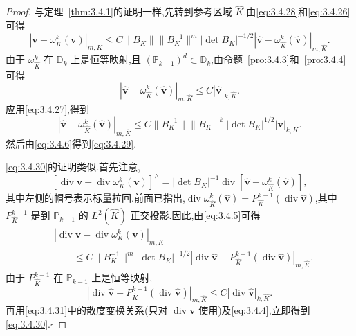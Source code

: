 \begin{proof}
与定理~\ref{thm:3.4.1}的证明一样,先转到参考区域 \(\widehat K\).由\eqref{eq:3.4.28}和\eqref{eq:3.4.26}可得
\[
  |\boldsymbol{v}-\omega_K^k(\boldsymbol{v})|_{m,K}
   \le C\|B_K\|\|B_K^{-1}\|^m|\det B_K|^{-1/2}
         |\widehat{\boldsymbol{v}}-\omega_{\widehat K}^k(\widehat{\boldsymbol{v}})|_{m,\widehat K}.
\]
由于 \(\omega_{\widehat K}^k\) 在 \(\mathbb D_k\) 上是恒等映射,且 \((\mathbb P_{k-1})^d\subset\mathbb D_k\),由命题~\ref{pro:3.4.3}和~\ref{pro:3.4.4}可得
\[
  |\widehat{\boldsymbol{v}}-\omega_{\widehat K}^k(\widehat{\boldsymbol{v}})|_{m,\widehat K}
  \le C|\widehat{\boldsymbol{v}}|_{k,\widehat K}.
\]
应用\eqref{eq:3.4.27},得到
\[
  |\widehat{\boldsymbol{v}}-\omega_{\widehat K}^k(\widehat{\boldsymbol{v}})|_{m,\widehat K}
  \le C\|B_K^{-1}\|\|B_K\|^k|\det B_K|^{1/2}|\boldsymbol{v}|_{k,K}.
\]
然后由\eqref{eq:3.4.6}得到\eqref{eq:3.4.29}.

\eqref{eq:3.4.30}的证明类似.首先注意,
\begin{equation}\label{eq:3.4.31}
  [\operatorname{div}\boldsymbol{v}-\operatorname{div}\omega_K^k(\boldsymbol{v})]^\wedge
   =|\det B_K|^{-1}
       \operatorname{div}[\widehat{\boldsymbol{v}}-\omega_{\widehat K}^k(\widehat{\boldsymbol{v}})],
\end{equation}
其中左侧的帽号表示标量拉回.前面已指出,\(\operatorname{div}\omega_{\widehat K}^k(\widehat{\boldsymbol{v}})
=P_{\widehat K}^{k-1}(\operatorname{div}\widehat{\boldsymbol{v}})\),其中 \(P_{\widehat K}^{k-1}\) 是到 \(\mathbb P_{k-1}\) 的 \(L^2(\widehat K)\) 正交投影.因此,由\eqref{eq:3.4.5}可得
\[
  \begin{aligned}
    &|\operatorname{div}\boldsymbol{v}-\operatorname{div}\omega_K^k(\boldsymbol{v})|_{m,K}\\
    &\qquad\le C\|B_K^{-1}\|^m|\det B_K|^{-1/2}
       |\operatorname{div}\widehat{\boldsymbol{v}}-
         P_{\widehat K}^{k-1}(\operatorname{div}\widehat{\boldsymbol{v}})|_{m,\widehat K}.
  \end{aligned}
\]
由于 \(P_{\widehat K}^{k-1}\) 在 \(\mathbb P_{k-1}\) 上是恒等映射,
\[
  |\operatorname{div}\widehat{\boldsymbol{v}}-
     P_{\widehat K}^{k-1}(\operatorname{div}\widehat{\boldsymbol{v}})|_{m,\widehat K}
   \le C|\operatorname{div}\widehat{\boldsymbol{v}}|_{k,\widehat K}.
\]
再用\eqref{eq:3.4.31}中的散度变换关系(只对 \(\operatorname{div}\boldsymbol{v}\) 使用)及\eqref{eq:3.4.4},立即得到\eqref{eq:3.4.30}.\hfill\(\square\)
\end{proof}

